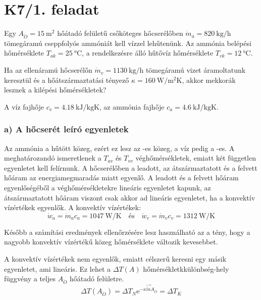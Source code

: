 
\section*{K7/1. feladat}
Egy $A_{\ddot{O}} = \SI{15}{\meter\squared}$ hőátadó felületű csőköteges hőcserélőben $\dot{m}_a = \SI{820}{\kilogram\per\hour}$ tömegáramú cseppfolyós ammóniát kell vízzel lehűtenünk. Az ammónia belépési hőmérséklete $T_{ak} = \SI{25}{\celsius}$, a rendelkezésre álló hűtővíz hőmérséklete $T_{vk} = \SI{12}{\celsius}$.

Ha az ellenáramú hőcserélőn $\dot{m}_v = \SI{1130}{\kilogram\per\hour}$ tömegáramú vizet áramoltatunk keresztül és a hőátszármaztatási tényező $\kappa = \SI{160}{\watt\per\meter\squared\kelvin}$, akkor mekkorák lesznek a kilépési hőmérsékletek?

A víz fajhője $c_v = \SI{4.18}{\kilo\joule\per\kilogram\kelvin}$, az ammónia fajhője $c_a = \SI{4.6}{\kilo\joule\per\kilogram\kelvin}$.

\subsubsection*{a) A hőcserét leíró egyenletek}
Az ammónia a hűtött közeg, ezért ez lesz az -es közeg, a víz pedig a -es. A meghatározandó ismeretlenek a $T_{av}$ és $T_{vv}$ véghőmérsékletek, emiatt két független egyenletet kell felírnunk. A hőcserélőben a leadott, az átszármaztatott és a felvett hőáram az energiamegmaradás miatt egyenlő. A leadott és a felvett hőáram egyenlőségéből a véghőmérsékletekre lineáris egyenletet kapunk, az átszármaztatott hőáram viszont csak akkor ad lineáris egyenletet, ha a konvektív vízértékek egyenlők. 
A konvektív vízértékek:
\begin{equation}
	\dot{w}_a = \dot{m}_a c_a = \SI{1047}{\watt\per\kelvin} 
	\quad \textrm{és} \quad 
	\dot{w}_v = \dot{m}_v c_v = \SI{1312}{\watt\per\kelvin} 
\end{equation}

Később a számítási eredmények ellenőrzésére lesz használható az a tény, hogy a nagyobb konvektív vízértékű közeg hőmérséklete változik kevesebbet.

A konvektív vízértékek nem egyenlők, emiatt célszerű keresni egy másik egyenletet, ami lineáris. Ez lehet a $\Delta T\!\left(A\right)$ hőmérsékletkkülönbség-hely függvény a teljes $A_{\ddot{O}}$ hőátadó felületre.
\begin{equation}
	\Delta T\!\left(A_{\ddot{O}}\right) = \Delta T_N \mathrm{e}^{-\kappa \overrightarrow{\overleftarrow{m}} A_{\ddot{O}}} = \Delta T_K
\end{equation}

